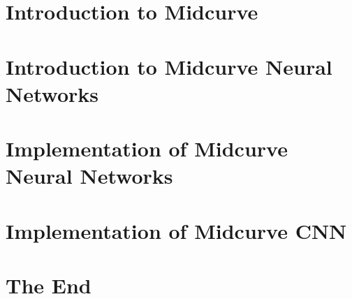 \section[Midcurve]{Introduction to Midcurve}


\section[Intro]{Introduction to Midcurve Neural Networks}


\section[NN]{Implementation of Midcurve Neural Networks}


\section[CNN]{Implementation of Midcurve CNN}


\section[End]{The End}


